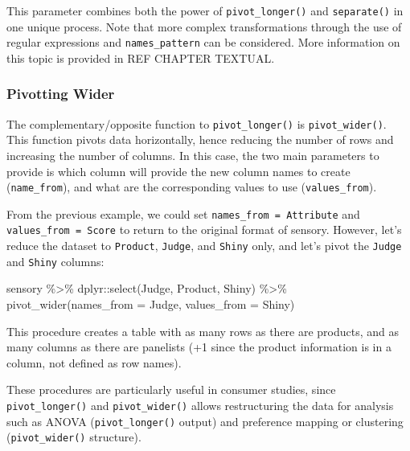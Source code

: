 \documentclass[
]{book}
\newenvironment{Shaded}{\begin{snugshade}}{\end{snugshade}}
\newcommand{\AttributeTok}[1]{\textcolor[rgb]{0.77,0.63,0.00}{#1}}
\newcommand{\FunctionTok}[1]{\textcolor[rgb]{0.00,0.00,0.00}{#1}}
\newcommand{\NormalTok}[1]{#1}
\newcommand{\SpecialCharTok}[1]{\textcolor[rgb]{0.00,0.00,0.00}{#1}}
\begin{document}
This parameter combines both the power of \texttt{pivot\_longer()} and \texttt{separate()} in one unique process. Note that more complex transformations through the use of regular expressions and \texttt{names\_pattern} can be considered. More information on this topic is provided in REF CHAPTER TEXTUAL.

\hypertarget{pivotting-wider}{%
\subsubsection{Pivotting Wider}\label{pivotting-wider}}

The complementary/opposite function to \texttt{pivot\_longer()} is \texttt{pivot\_wider()}. This function pivots data horizontally, hence reducing the number of rows and increasing the number of columns. In this case, the two main parameters to provide is which column will provide the new column names to create (\texttt{name\_from}), and what are the corresponding values to use (\texttt{values\_from}).

From the previous example, we could set \texttt{names\_from\ =\ Attribute} and \texttt{values\_from\ =\ Score} to return to the original format of sensory. However, let's reduce the dataset to \texttt{Product}, \texttt{Judge}, and \texttt{Shiny} only, and let's pivot the \texttt{Judge} and \texttt{Shiny} columns:

\begin{Shaded}
\begin{Highlighting}[]
\NormalTok{sensory }\SpecialCharTok{\%\textgreater{}\%} 
\NormalTok{  dplyr}\SpecialCharTok{::}\FunctionTok{select}\NormalTok{(Judge, Product, Shiny) }\SpecialCharTok{\%\textgreater{}\%} 
  \FunctionTok{pivot\_wider}\NormalTok{(}\AttributeTok{names\_from =}\NormalTok{ Judge, }\AttributeTok{values\_from =}\NormalTok{ Shiny)}
\end{Highlighting}
\end{Shaded}

This procedure creates a table with as many rows as there are products, and as many columns as there are panelists (+1 since the product information is in a column, not defined as row names).

These procedures are particularly useful in consumer studies, since \texttt{pivot\_longer()} and \texttt{pivot\_wider()} allows restructuring the data for analysis such as ANOVA (\texttt{pivot\_longer()} output) and preference mapping or clustering (\texttt{pivot\_wider()} structure).
\end{document}
